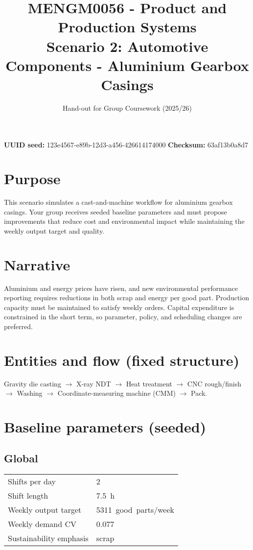 \documentclass[11pt,a4paper]{article}
\title{MENGM0056 - Product and Production Systems\\Scenario 2: Automotive Components - Aluminium Gearbox Casings}
\author{Hand-out for Group Coursework (2025/26)}
\date{}
\begin{document}
\maketitle

\noindent \textbf{UUID seed:} 123e4567-e89b-12d3-a456-426614174000 \quad \textbf{Checksum:} 63af13b0a8d7

\section*{Purpose}
This scenario simulates a cast-and-machine workflow for aluminium gearbox casings. Your group receives seeded baseline parameters and must propose improvements that reduce cost and environmental impact while maintaining the weekly output target and quality.

\section*{Narrative}
Aluminium and energy prices have risen, and new environmental performance reporting requires reductions in both scrap and energy per good part. Production capacity must be maintained to satisfy weekly orders. Capital expenditure is constrained in the short term, so parameter, policy, and scheduling changes are preferred.

\section*{Entities and flow (fixed structure)}
Gravity die casting $\rightarrow$ X-ray NDT $\rightarrow$ Heat treatment $\rightarrow$ CNC rough/finish $\rightarrow$ Washing $\rightarrow$ Coordinate-measuring machine (CMM) $\rightarrow$ Pack.

\section*{Baseline parameters (seeded)}
\subsection*{Global}
\begin{tabular}{@{}ll@{}}
\toprule
Shifts per day & 2 \\
Shift length & 7.5~h \\
Weekly output target & 5311~good~parts/week \\
Weekly demand CV & 0.077 \\
Sustainability emphasis & scrap \\
\bottomrule
\end{tabular}
\end{document}
